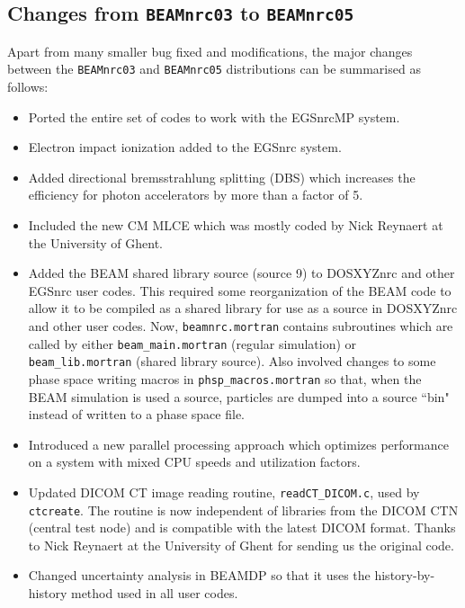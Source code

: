 \documentclass[12pt,twoside]{article}
\begin{document}
\subsection{Changes from {\tt BEAMnrc03} to {\tt BEAMnrc05}}

Apart from many smaller bug fixed and modifications,
the major changes between the {\tt BEAMnrc03} and {\tt BEAMnrc05}
distributions can be summarised as follows:

\begin{itemize}

\item Ported the entire set of codes to work with the EGSnrcMP system.

\item Electron impact ionization added to the EGSnrc system.

\item Added directional bremsstrahlung splitting (DBS) which increases the
efficiency for photon accelerators by more than a factor of 5.

\item Included the new CM MLCE which was mostly coded by Nick Reynaert at the
University of Ghent.

\item Added the BEAM shared library source (source 9) to DOSXYZnrc and
other EGSnrc user codes.  This required some reorganization of the
BEAM code to allow it to be compiled as a shared
library for use as a source in DOSXYZnrc and other user codes.  Now,
{\tt beamnrc.mortran} contains subroutines which are called by
either {\tt beam\_main.mortran} (regular simulation) or
{\tt beam\_lib.mortran} (shared library source).  Also involved changes
to some phase space writing macros in {\tt phsp\_macros.mortran} so
that, when the BEAM simulation is used a source, particles are dumped
into a source ``bin" instead of written to a phase space file.

\item Introduced a new parallel processing approach which optimizes
performance on a system with mixed CPU speeds and utilization factors.

\item Updated DICOM CT image reading routine, {\tt readCT\_DICOM.c}, used by
{\tt ctcreate}.  The routine is now independent of libraries from
the DICOM CTN (central test node) and is compatible with the latest
DICOM format.  Thanks to Nick Reynaert at the
University of Ghent for sending us the original
code.

\item Changed uncertainty analysis in BEAMDP so that it uses the
history-by-history method used in all user codes.


\end{itemize}
\end{document}
